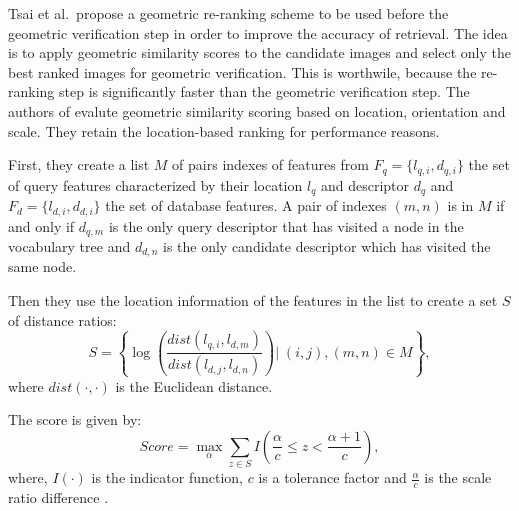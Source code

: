 Tsai et al.\ propose a geometric re-ranking scheme \cite{tsai2010fast} to be used before the geometric verification step in order to improve the accuracy of retrieval. The idea is to apply geometric similarity scores to the candidate images and select only the best ranked images for geometric verification. This is worthwile, because the re-ranking step is significantly faster than the geometric verification step. The authors of \cite{tsai2010fast} evalute geometric similarity scoring based on location, orientation and scale. They retain the location-based ranking for performance reasons.

First, they create a list $M$ of pairs indexes of features from $F_q = \{ l_{q,i}, d_{q,i}\}$ the set of query features characterized by their location $l_q$ and descriptor $d_q$ and $F_d = \{ l_{d,i}, d_{d,i}\}$ the set of database features. A pair of indexes $(m,n)$ is in $M$ if and only if $d_{q,m}$ is the only query descriptor that has visited a node in the vocabulary tree and $d_{d,n}$ is the only candidate descriptor which has visited the same node.

Then they use the location information of the features in the list to create a set $S$ of distance ratios:
\begin{equation}
    S = \left\{ \log \left( \frac{dist(l_{q,i},l_{d,m})}{dist(l_{d,j},l_{d,n})} \right) \big| \; (i,j),(m,n) \in M \right\},
\end{equation}
where $dist(\cdot,\cdot)$ is the Euclidean distance.

The score is given by:
\begin{equation}
    Score = \underset{\alpha}{\max} \sum_{z \in S} I\left( \frac{\alpha}{c} \leq z < \frac{\alpha + 1}{c} \right),
\end{equation}
where, $I(\cdot)$ is the indicator function, $c$ is a tolerance factor and $\frac{\alpha}{c}$ is the scale ratio difference \cite{tsai2010fast}.
